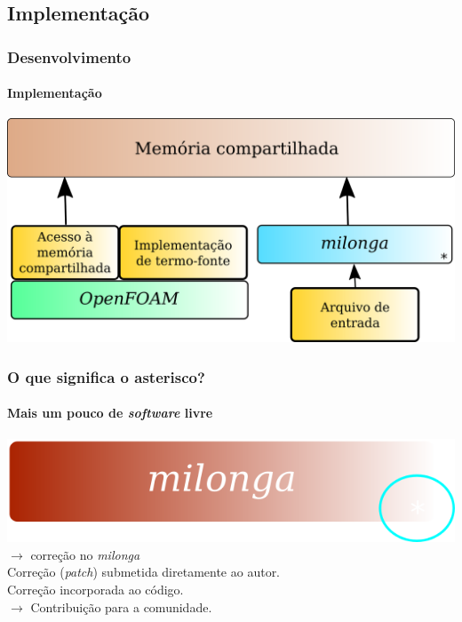 \documentclass[svgnames,smaller,table]{beamer}
\begin{document}
\subsection{Implementação}
\begin{frame}
  \frametitle{Desenvolvimento}
  \framesubtitle{Implementação}
  \centering\includegraphics[scale=0.9]{../figuras/metod-2.png}
\end{frame}


{

\begin{frame}
  \frametitle{O que significa o asterisco?}
  \framesubtitle{Mais um pouco de \textit{software} livre}
  \centering
  \includegraphics[scale=1.0]{../figuras/mil-asterisco-neg.png}
  $\rightarrow$ correção no \textit{milonga}
  \\
  \vspace{0.5cm}
  Correção (\textit{patch}) submetida diretamente ao autor.
  \\
  Correção incorporada ao código.
  \\
  \vspace{0.5cm}
  \Large{$\rightarrow$ Contribuição para a comunidade.}
\end{frame}
}
\end{document}
